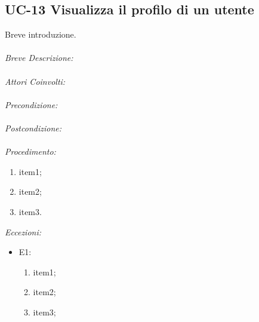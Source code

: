 \subsection{UC-13 Visualizza il profilo di un utente}
Breve introduzione.
\\
\\
\textit{Breve Descrizione:} 
\\
\\
\textit{Attori Coinvolti:}
\\
\\
\textit{Precondizione:}
\\
\\
\textit{Postcondizione:}
\\
\\
\textit{Procedimento:}
\begin{enumerate}
	\item item1;
	\item item2;
	\item item3.
\end{enumerate}


\textit{Eccezioni:}
\begin{itemize}
	\item E1:
	\begin{enumerate}
		\item item1;
		\item item2;
		\item item3;
	\end{enumerate}
\end{itemize}